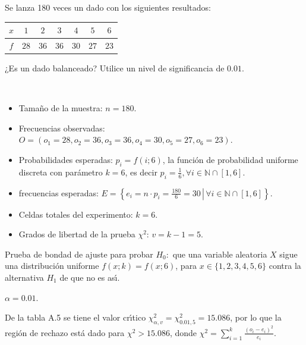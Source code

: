 \begin{enunciado}
 Se lanza 180 veces un dado con los siguientes resultados:
 \begin{center}
  \begin{tabular}{c|cccccc}
   $x$ &  $1$ &  $2$ &  $3$ &  $4$ &  $5$ &  $6$ \\
   \hline
   $f$ & $28$ & $36$ & $36$ & $30$ & $27$ & $23$ 
  \end{tabular}
 \end{center}
 ¿Es un dado balanceado? Utilice un nivel de significancia de $0.01$.
\end{enunciado}

\begin{solucion}
 \begin{datos}
  $\phantom{0}$
  \begin{itemize}
   \item Tama\~no de la muestra: $n=180$.
   \item Frecuencias observadas:
   $O = (o_1 = 28, o_2 = 36, o_3 = 36, o_4 = 30, o_5 = 27, o_6 = 23)$.
   \item Probabilidades esperadas: $p_i = f(i;6)$,
   la funci\'on de probabilidad uniforme discreta con par\'ametro $k=6$,
   es decir $p_i = \frac{1}{6}, \forall i \in \mathbb{N}\cap[1,6]$.
   \item frecuencias esperadas:
   $E = \left\{ \left. e_i = n\cdot p_i = \frac{180}{6} = 30 \, \right| \, \forall i \in \mathbb{N}\cap[1,6] \right\}$.
   \item Celdas totales del experimento: $k=6$.
   \item Grados de libertad de la prueba $\chi^2$: $v = k-1 = 5$.
  \end{itemize}
 \end{datos}
 
 \begin{hipotesis}
  Prueba de bondad de ajuste para probar $H_0:$
  que una variable aleatoria $X$ sigue una distribuci\'on uniforme
  $f(x;k) = f(x;6)$, para $x \in\{1,2,3,4,5,6\}$
  contra la alternativa $H_1$ de que no es as\'{\i}.
 \end{hipotesis}

 \begin{significancia}
  $\alpha = 0.01$.
 \end{significancia}

 \begin{region}
  De la tabla A.5 se tiene el valor cr\'{\i}tico
  $\chi^2_{\alpha,v} = \chi^2_{0.01,5} = 15.086$,
  por lo que la regi\'on de rechazo est\'a dado
  para $\chi^2 > 15.086$, donde
  $\chi^2 = \sum_{i=1}^k \frac{\left( o_i - e_i \right)^2}{e_i}$.
 \end{region}


\end{solucion}
